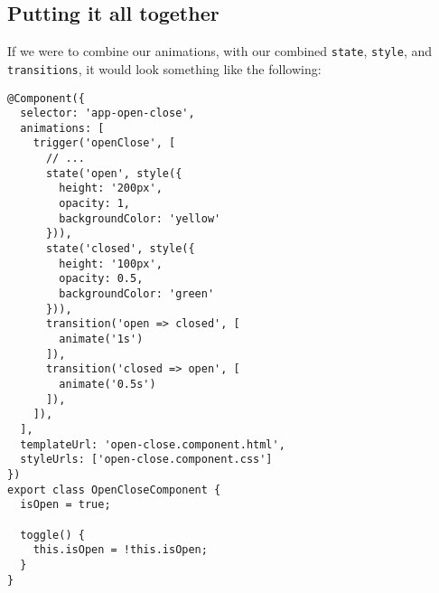 \subsection{ Putting it all together }
If we were to combine our animations, with our combined \lstinline{state}, 
\lstinline{style}, and \lstinline{transitions}, it would look something like 
the following:
\begin{lstlisting}
@Component({
  selector: 'app-open-close',
  animations: [
    trigger('openClose', [
      // ...
      state('open', style({
        height: '200px',
        opacity: 1,
        backgroundColor: 'yellow'
      })),
      state('closed', style({
        height: '100px',
        opacity: 0.5,
        backgroundColor: 'green'
      })),
      transition('open => closed', [
        animate('1s')
      ]),
      transition('closed => open', [
        animate('0.5s')
      ]),
    ]),
  ],
  templateUrl: 'open-close.component.html',
  styleUrls: ['open-close.component.css']
})
export class OpenCloseComponent {
  isOpen = true;

  toggle() {
    this.isOpen = !this.isOpen;
  }
}
\end{lstlisting}